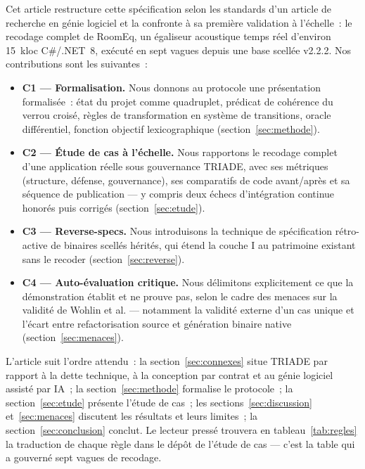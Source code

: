 Cet article restructure cette spécification selon les standards d’un article de
recherche en génie logiciel et la confronte à sa première validation à
l’échelle~: le recodage complet de RoomEq, un égaliseur acoustique temps réel
d’environ 15~kloc C\#/.NET~8, exécuté en sept vagues depuis une base scellée
v2.2.2. Nos contributions sont les suivantes~:
\begin{itemize}
\item \textbf{C1 — Formalisation.} Nous donnons au protocole une présentation
formalisée~: état du projet comme quadruplet, prédicat de cohérence du verrou
croisé, règles de transformation en système de transitions, oracle
différentiel, fonction objectif lexicographique
(section~\ref{sec:methode}).
\item \textbf{C2 — Étude de cas à l’échelle.} Nous rapportons le recodage
complet d’une application réelle sous gouvernance TRIADE, avec ses métriques
(structure, défense, gouvernance), ses comparatifs de code avant/après et sa
séquence de publication — y compris deux échecs d’intégration continue honorés
puis corrigés (section~\ref{sec:etude}).
\item \textbf{C3 — Reverse-specs.} Nous introduisons la technique de
spécification rétro-active de binaires scellés hérités, qui étend la couche I
au patrimoine existant sans le recoder (section~\ref{sec:reverse}).
\item \textbf{C4 — Auto-évaluation critique.} Nous délimitons explicitement ce
que la démonstration établit et ne prouve pas, selon le cadre des menaces sur
la validité de Wohlin et al. \cite{wohlin2012} — notamment la validité externe
d’un cas unique et l’écart entre refactorisation source et génération binaire
native (section~\ref{sec:menaces}).
\end{itemize}

L’article suit l’ordre attendu~: la section~\ref{sec:connexes} situe TRIADE
par rapport à la dette technique, à la conception par contrat et au génie
logiciel assisté par IA~; la section~\ref{sec:methode} formalise le
protocole~; la section~\ref{sec:etude} présente l’étude de cas~; les
sections~\ref{sec:discussion} et~\ref{sec:menaces} discutent les résultats et
leurs limites~; la section~\ref{sec:conclusion} conclut. Le lecteur pressé
trouvera en tableau~\ref{tab:regles} la traduction de chaque règle dans le
dépôt de l’étude de cas — c’est la table qui a gouverné sept vagues de
recodage.
